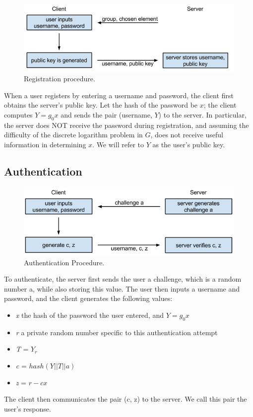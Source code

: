 \documentclass[11pt]{article}
\begin{document}
\begin{figure}[h]
  \centering
\includegraphics[scale=0.65]{currentauth.png}

 \caption{Registration procedure.}
 \label{fig:registration}
\end{figure}

When a user registers by entering a username and password, the client first obtains the server’s public key.  Let the hash of the password be $x$; the client computes $Y = g_0x$ and sends the pair (username, $Y$) to the server.  In particular, the server does NOT receive the password during registration, and assuming the difficulty of the discrete logarithm problem in $G$, does not receive useful information in determining $x$.  We will refer to $Y$ as the user’s public key.\cite{Lum}


\subsection{Authentication}
\begin{figure}[h]
  \centering
\includegraphics[scale=0.65]{auth.png}

 \caption{Authentication Procedure.}
 \label{fig:authentication}
\end{figure}

To authenticate, the server first sends the user a challenge, which is a random number a, while also storing this value.  The user then inputs a username and password, and the client generates the following values:
\begin{itemize}
  \item {\em x} the hash of the password the user entered, and $Y = g_0x$
  \item {\em r} a private random number specific to this authentication attempt
  \item {\em T} = $Y_r$
  \item {\em c} = $hash(Y || T || a)$
  \item {\em z} = $r - cx$
\end{itemize}
The client then communicates the pair (c, z) to the server.  We call this pair the user’s response.
\end{document}
